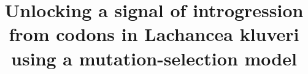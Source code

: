 \documentclass{bmcart}
\begin{document}
  
\begin{frontmatter}

\begin{fmbox}
  
\title{Unlocking a signal of introgression from codons in Lachancea kluveri using a mutation-selection model}

\author[
   addressref={aff1, aff2, aff3},                   %
   corref={aff3},                       %
   email={cedric.landerer@gmail.com}   %
]{ }
\author[
   addressref={aff1,aff2},
   email={bomeara@utk.edu}
]{ }
\author[
   addressref={aff2,aff4},
   email={russell.zaretzki@gmail.com}
]{ }
\author[
   addressref={aff1,aff2},
   email={mikeg@utk.edu}
]{ }



\end{fmbox}
\end{frontmatter}
\end{document}
